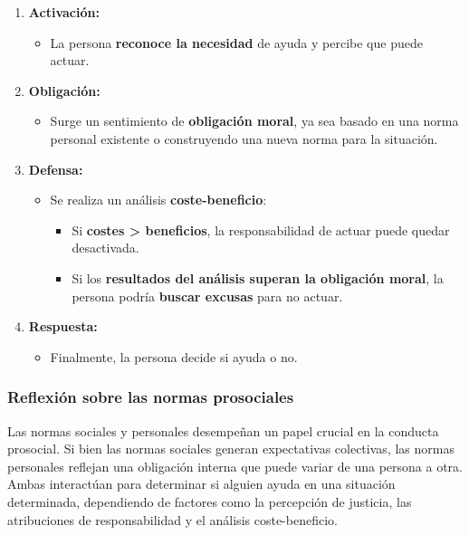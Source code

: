 \documentclass[
]{book}
\providecommand{\tightlist}{%
  \setlength{\itemsep}{0pt}\setlength{\parskip}{0pt}}
\begin{document}
\begin{enumerate}
\def\labelenumi{\arabic{enumi}.}
\tightlist
\item
  \textbf{Activación:}

  \begin{itemize}
  \tightlist
  \item
    La persona \textbf{reconoce la necesidad} de ayuda y percibe que puede actuar.
  \end{itemize}
\item
  \textbf{Obligación:}

  \begin{itemize}
  \tightlist
  \item
    Surge un sentimiento de \textbf{obligación moral}, ya sea basado en una norma personal existente o construyendo una nueva norma para la situación.
  \end{itemize}
\item
  \textbf{Defensa:}

  \begin{itemize}
  \tightlist
  \item
    Se realiza un análisis \textbf{coste-beneficio}:

    \begin{itemize}
    \tightlist
    \item
      Si \textbf{costes \textgreater{} beneficios}, la responsabilidad de actuar puede quedar desactivada.
    \item
      Si los \textbf{resultados del análisis superan la obligación moral}, la persona podría \textbf{buscar excusas} para no actuar.
    \end{itemize}
  \end{itemize}
\item
  \textbf{Respuesta:}

  \begin{itemize}
  \tightlist
  \item
    Finalmente, la persona decide si ayuda o no.
  \end{itemize}
\end{enumerate}

\subsubsection{Reflexión sobre las normas prosociales}\label{reflexiuxf3n-sobre-las-normas-prosociales}

Las normas sociales y personales desempeñan un papel crucial en la conducta prosocial. Si bien las normas sociales generan expectativas colectivas, las normas personales reflejan una obligación interna que puede variar de una persona a otra. Ambas interactúan para determinar si alguien ayuda en una situación determinada, dependiendo de factores como la percepción de justicia, las atribuciones de responsabilidad y el análisis coste-beneficio.
\end{document}
